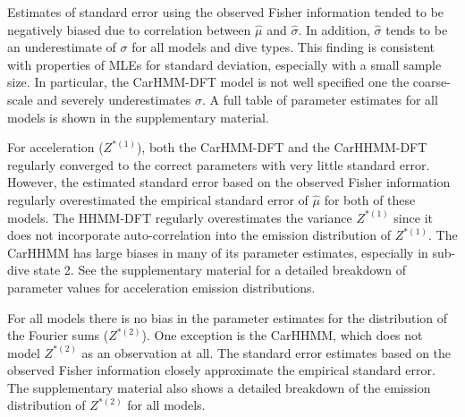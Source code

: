 Estimates of standard error using the observed Fisher information tended to be negatively biased due to correlation between $\hat \mu$ and $\hat \sigma$. In addition, $\hat \sigma$ tends to be an underestimate of $\sigma$ for all models and dive types. This finding is consistent with properties of MLEs for standard deviation, especially with a small sample size. In particular, the CarHMM-DFT model is not well specified one the coarse-scale and severely underestimates $\sigma$. %
A full table of parameter estimates for all models is shown in the supplementary material.


For acceleration ($Z^{*(1)}$), both the CarHMM-DFT and the CarHHMM-DFT regularly converged to the correct parameters with very little standard error. However, the estimated standard error based on the observed Fisher information regularly overestimated the empirical standard error of $\hat \mu$ for both of these models. 
The HHMM-DFT regularly overestimates the variance $Z^{*(1)}$ since it does not incorporate auto-correlation into the emission distribution of $Z^{*(1)}$. The CarHHMM has large biases in many of its parameter estimates, especially in sub-dive state 2. 
See the supplementary material for a detailed breakdown of parameter values for acceleration emission distributions.

For all models there is no bias in the parameter estimates for the distribution of the Fourier sums ($Z^{*(2)}$). One exception is the CarHHMM, which does not model $Z^{*(2)}$ as an observation at all. The standard error estimates based on the observed Fisher information closely approximate the empirical standard error.
The supplementary material also shows a detailed breakdown of the emission distribution of $Z^{*(2)}$ for all models.

